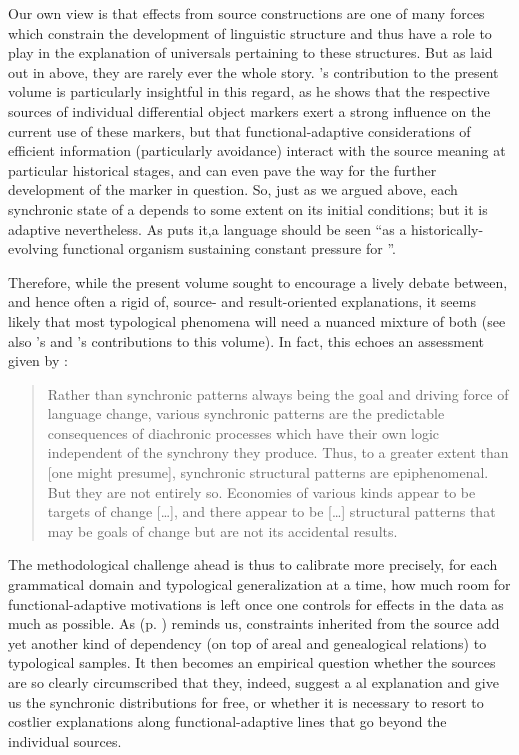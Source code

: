 \documentclass[output=paper]{langsci/langscibook}
\begin{document}
Our own view is that  effects from source constructions are one of many forces which constrain the development of linguistic structure and thus have a role to play in the explanation of universals pertaining to these structures. But as laid out in  above, they are rarely ever the whole story. ’s contribution to the present volume is particularly insightful in this regard, as he shows that the respective sources of individual differential object markers exert a strong influence on the current use of these markers, but that functional-adaptive considerations of efficient information  (particularly  avoidance) interact with the source meaning at particular historical stages, and can even pave the way for the further development of the marker in question. So, just as we argued above, each synchronic state of a  depends to some extent on its initial conditions; but it is adaptive nevertheless. As \citet[263]{Shibatani2006} puts it,\largerpage a language should be seen “as a historically-evolving functional organism sustaining constant pressure for ”. 

\newpage 
Therefore, while the present volume sought to encourage a lively debate between, and hence often a rigid  of, source- and result-oriented explanations, it seems likely that most typological phenomena will need a nuanced mixture of both (see also ’s and ’s contributions to this volume). In fact, this echoes an assessment given by \citet[287--288]{Nichols2008_Diach}:


\begin{quote}
Rather than synchronic patterns always being the goal and driving force of language change, various synchronic patterns are the predictable consequences of diachronic processes which have their own logic independent of the synchrony they produce. Thus, to a greater extent than [one might presume], synchronic structural patterns are epiphenomenal. But they are not entirely so. Economies of various kinds appear to be targets of change […], and there appear to be […] structural patterns that may be goals of change but are not its accidental results.
\end{quote}

The methodological challenge ahead is thus to calibrate more precisely, for each grammatical domain and typological generalization at a time, how much room for functional-adaptive motivations is left once one controls for  effects in the data as much as possible. As  (p. \pageref{p:collins:dependency}) reminds us, constraints inherited from the source add yet another kind of dependency (on top of areal and genealogical relations) to typological samples. It then becomes an empirical question whether the sources are so clearly circumscribed that they, indeed, suggest a al explanation and give us the synchronic distributions for free, or whether it is necessary to resort to costlier explanations along functional-adaptive lines that go beyond the individual sources.
\end{document}
